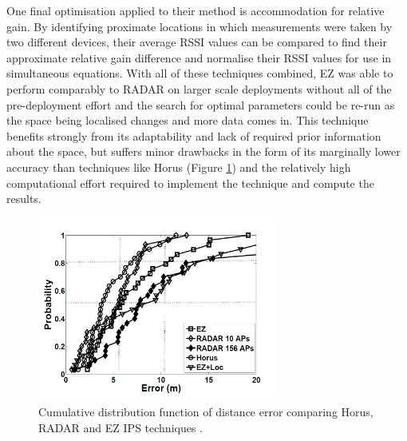 \documentclass{UoYCSproject}
\begin{document}
                One final optimisation applied to their method is accommodation for relative gain. By identifying proximate locations in which measurements were taken by two different devices, their average RSSI values can be compared to find their approximate relative gain difference and normalise their RSSI values for use in simultaneous equations. With all of these techniques combined, EZ was able to perform comparably to RADAR on larger scale deployments without all of the pre-deployment effort and the search for optimal parameters could be re-run as the space being localised changes and more data comes in. This technique benefits strongly from its adaptability and lack of required prior information about the space, but suffers minor drawbacks in the form of its marginally lower accuracy than techniques like Horus (Figure \ref{fig:EZHorusRADARComparison}) and the relatively high computational effort required to implement the technique and compute the results.
                
                \begin{figure}[h]
                    \label{fig:EZHorusRADARComparison}
                    \centering
                    \includegraphics[width=0.7\textwidth]{EZHorusRADARComparison.png}
                    \caption{Cumulative distribution function of distance error comparing Horus, RADAR and EZ IPS techniques \citep{chintalapudi2010indoor}.}
                \end{figure}
                
\end{document}
